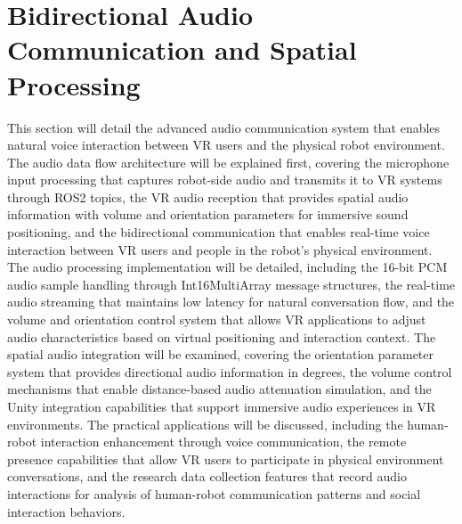 \section{Bidirectional Audio Communication and Spatial Processing}
This section will detail the advanced audio communication system that enables natural voice interaction between VR users and the physical robot environment. The audio data flow architecture will be explained first, covering the microphone input processing that captures robot-side audio and transmits it to VR systems through ROS2 topics, the VR audio reception that provides spatial audio information with volume and orientation parameters for immersive sound positioning, and the bidirectional communication that enables real-time voice interaction between VR users and people in the robot's physical environment. The audio processing implementation will be detailed, including the 16-bit PCM audio sample handling through Int16MultiArray message structures, the real-time audio streaming that maintains low latency for natural conversation flow, and the volume and orientation control system that allows VR applications to adjust audio characteristics based on virtual positioning and interaction context. The spatial audio integration will be examined, covering the orientation parameter system that provides directional audio information in degrees, the volume control mechanisms that enable distance-based audio attenuation simulation, and the Unity integration capabilities that support immersive audio experiences in VR environments. The practical applications will be discussed, including the human-robot interaction enhancement through voice communication, the remote presence capabilities that allow VR users to participate in physical environment conversations, and the research data collection features that record audio interactions for analysis of human-robot communication patterns and social interaction behaviors.
